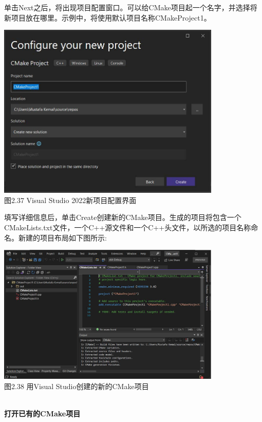 单击Next之后，将出现项目配置窗口。可以给CMake项目起一个名字，并选择将新项目放在哪里。示例中，将使用默认项目名称CMakeProject1。

\begin{center}
\includegraphics[width=0.8\textwidth]{content/1/chapter2/images/37.jpg}\\
图2.37  Visual Studio 2022新项目配置界面
\end{center}

填写详细信息后，单击Create创建新的CMake项目。生成的项目将包含一个CMakeLists.txt文件，一个C++源文件和一个C++头文件，以所选的项目名称命名。新建的项目布局如下图所示:

\begin{center}
\includegraphics[width=0.8\textwidth]{content/1/chapter2/images/38.jpg}\\
图2.38 用Visual Studio创建的新的CMake项目
\end{center}

\hspace*{\fill} \\ %
\noindent
\textbf{打开已有的CMake项目}

